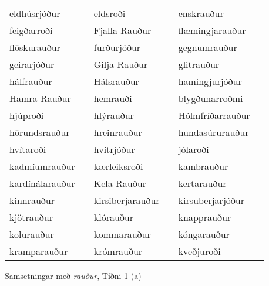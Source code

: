 \documentclass[../samsetningasafn.tex]{subfiles}
\begin{document}
\begin{wordlist}[H]
\begin{tcolorbox}
\begin{tabular}{BlBlBl}
		eldhúsrjóður		&		& 
		eldsroði			&		& 
		enskrauður		&		\\  %
		feigðarroði		&		& 
		Fjalla-Rauður		&		& 
		flæmingjarauður	&		\\  %
		flöskurauður		&		& 
		furðurjóður		&		& 
		gegnumrauður	&		\\  %
		geirarjóður		&		& 
		Gilja-Rauður		&		& 
		glitrauður		&		\\  %
		hálfrauður		&		& 
		Hálsrauður		&		& 
		hamingjurjóður	&		\\  %
		Hamra-Rauður	&		& 
		hemrauði		&		& 
		blygðunarroðmi	&		\\  %
		hjúproði			&		& 
		hlýrauður		& 		& 
		Hólmfríðarrauður	&		\\  %
		hörundsrauður	&		& 
		hreinrauður		&		& 
		hundasúrurauður	&		\\  %
		hvítaroði			&		& 
		hvítrjóður		&		& 
		jólaroði			&		\\  %
		kadmíumrauður	&		& 
		kærleiksroði		&		& 
		kambrauður		&		\\  %
		kardínálarauður	&		& 
		Kela-Rauður		&		& 
		kertarauður		&		\\  %
		kinnrauður		&		& 
		kirsiberjarauður	&		& 
		kirsuberjarjóður	&		\\  %
		kjötrauður		&		& 
		klórauður		&		& 
		knapprauður		&		\\  %
		kolurauður		&		& 
		kommarauður	&		& 
		kóngarauður		&		\\  %
		kramparauður	&		& 
		krómrauður		&		& 
		kveðjuroði		&		  %
	\end{tabular}

\end{tcolorbox}
	\caption{Samsetningar með \textit{rauður}, Tíðni 1 (a)}
	\label{listi:rautt.1a}
\end{wordlist}	
\end{document}
